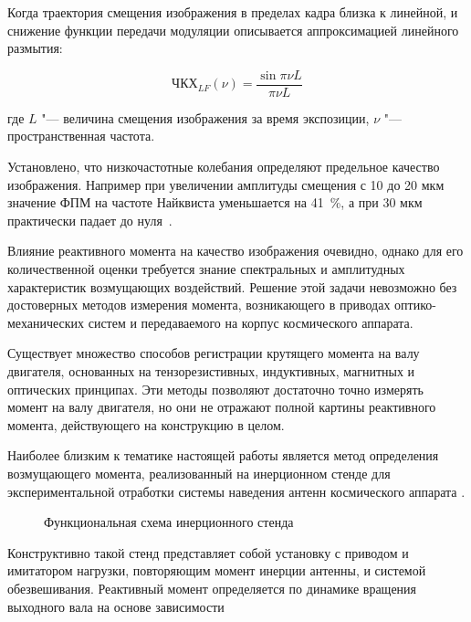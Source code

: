 Когда траектория смещения изображения в пределах кадра близка к линейной, и снижение функции передачи модуляции описывается аппроксимацией
линейного размытия:

\begin{equation}
	\label{mtf_lf}
	\text{ЧКХ}_{LF}(\nu)=\frac{\sin{\pi \nu L}}{\pi \nu L}
\end{equation}

где \(L\) "--- величина смещения изображения за время экспозиции, \(\nu\) "--- пространственная частота.

Установлено, что низкочастотные колебания определяют предельное качество изображения. Например при увеличении амплитуды смещения с 10 до 20 мкм значение ФПМ на частоте Найквиста уменьшается на 41~\%, а при 30 мкм практически падает до нуля~\cite{wahballah2018smear}.

Влияние реактивного момента на качество изображения очевидно, однако для его количественной оценки требуется знание спектральных и амплитудных характеристик возмущающих воздействий. Решение этой задачи невозможно без достоверных методов измерения момента, возникающего в приводах оптико-механических систем и передаваемого на корпус космического аппарата.

Существует множество способов регистрации крутящего момента на валу двигателя, основанных на тензорезистивных, индуктивных, магнитных и оптических принципах. Эти методы позволяют достаточно точно измерять момент на валу двигателя, но они не отражают полной картины реактивного момента, действующего на конструкцию в целом.

Наиболее близким к тематике настоящей работы является метод определения возмущающего момента, реализованный на инерционном стенде для экспериментальной отработки системы наведения антенн космического аппарата \cite{Goncharuk2013}. 

\begin{figure}[h!] 
	\caption{Функциональная схема инерционного стенда}
	\label{fig:stand} 
\end{figure}

Конструктивно такой стенд представляет собой установку с приводом и имитатором нагрузки, повторяющим момент инерции антенны, и системой обезвешивания. Реактивный момент определяется по динамике вращения выходного вала на основе зависимости

